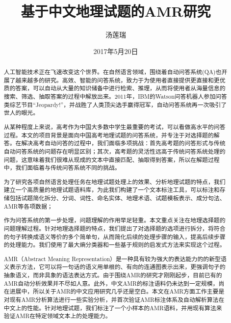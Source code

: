 \documentclass[master, winfont]{njuthesis}
\title{基于中文地理试题的AMR研究}
\author{汤莲瑞}
\institute{南京大学}
\date{2017年5月20日}
\begin{document}

\maketitle
\makeenglishtitle


\frontmatter

\begin{abstract}
人工智能技术正在飞速改变这个世界。在自然语言领域，围绕着自动问答系统(QA)也开展了越来越多的研究。高效、智能的问答系统，致力于为使用者直接提供更直接和更优质的答案，可以自动从大量的知识储备中进行检索、推理，从而将使用者从海量信息的搜索、筛选、抽取答案的过程中解放出来。2011年，IBM的Watson问答机器人参加问答类综艺节目“Jeopardy!”，并战胜了人类顶尖选手赢得冠军，自动问答系统再一次吸引了世人的眼光。

从某种程度上来说，高考作为中国大多数中学生最重要的考试，可以看做高水平的问答过程。本文的项目背景是面向中国高考地理试题的问答系统，并专注于对选择题的解答。在解决高考自动问答的过程中，我们面临多项挑战：首先高考题的问答形式与传统自动问答系统的问题存在明显区别；其次，高考题的灵活性远高于传统问答系统处理的问题，这意味着我们很难从现成的文本中直接匹配、抽取得到答案，所以在解题过程中，我们面临着与传统问答系统不同的挑战。

为了研究各项自然语言处理任务在地理试题处理上的效果、分析地理试题的特点，我们建立一个高质量的地理试题语料库，为此我们构建了一个文本标注工具，可以标注和存储包括试题简化拆分、分词、词性、命名实体、地理术语、试题模板表示、成分句法、AMR等各项数据；

作为问答系统的第一步处理，问题理解的作用举足轻重。本文重点关注在地理选择题的问题理解过程。针对地理选择题的特点，我们提出了对选择题的选项进行拆分，将符合的句子转换成语义等价的多个简单句，从而简化后续的处理步骤的输入，提高后续步骤的处理能力。我们使用了最大熵分类器和一些基于规则的启发式方法来实现这个过程。

AMR（Abstract Meaning Representation）是一种具有较为强大的表达能力的的新型语义表示方法，它可以将一句话的语义用单根的、有向的连通图表示出来，更强调句子的抽象语义，而非具象的语法表达方式。由于围绕AMR的研究才刚刚起步，目前已有的AMR自动分析效果并不尽如人意。此外，中文AMR的标注语料仍未达到一定规模，尚在进展中，所以关于AMR的中文应用研究几乎还是空白。本文在AMR方面工作主要是对现有AMR分析算法进行一些实验分析，并首次验证AMR标注体系及自动解析算法在中文上的性能。针对地理试题，我们标注了一个小样本的AMR语料，并用现有算法来验证AMR在特定领域文本上的处理能力。

\end{abstract}
\end{document}

